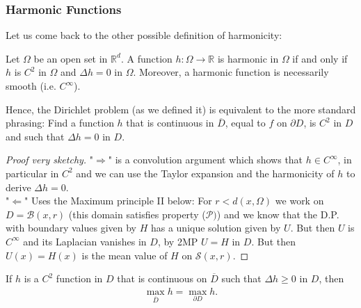 \documentclass[../mainfile.tex]{subfiles}
\begin{document}
\subsubsection{Harmonic Functions}
Let us come back to the other possible definition of harmonicity:
\begin{prop} Let $\Omega$ be an open set in $\mathbb{R}^d$. A function $h : \Omega \to \mathbb{R}$ is harmonic in $\Omega$ if and only if $h$ is $C^2$ in $\Omega$ and $\Delta h=0$ in $\Omega$. Moreover, a harmonic function is necessarily smooth (i.e. $C^\infty$). 
\end{prop}
\begin{rem} Hence, the Dirichlet problem (as we defined it) is equivalent to the more standard  phrasing: Find a function $h$ that is continuous in $\overline{D}$, equal to $f$ on $\partial D$, is $C^2$ in $D$ and such that $\Delta h=0$ in $D$. 
\end{rem}
\begin{proof}[Proof very sketchy] "$\Longrightarrow$" is a convolution argument which shows that $h \in C^\infty$, in particular in $C^2$ and we can use the Taylor expansion and the harmonicity of $h$ to derive $\Delta h=0$. 
\\
"$\Longleftarrow$" Uses the Maximum principle II below: For $r<d(x, \Omega)$ we work on $D= \mathcal{B}(x,r)$ (this domain satisfies property ($\mathcal{P})$) and we know that the D.P. with boundary values given by $H$ has a unique solution given by $U$. But then $U$ is $C^\infty$ and its Laplacian vanishes in $D$, by 2MP $U=H$ in $D$. But then $U(x)=H(x)$ is the mean value of $H$ on $\mathcal{S}(x,r)$.

\end{proof}
\begin{lem} If $h$ is a $C^2$ function in $D$ that is continuous on $\overline{D}$ such that $\Delta h \geq 0$ in $D$, then 
\begin{align*}
\max_{\overline{D}} h = \max_{\partial D} h. 
\end{align*}
\end{lem}
\end{document}
